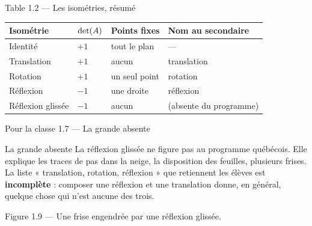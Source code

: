 \begin{frame}{Table 1.2 --- Les isométries, résumé}
  \begin{center}
  \begin{tabular}{llll}
    \toprule
    Isométrie & $\operatorname{det}(A)$ & Points fixes & Nom au secondaire\\
    \midrule
    Identité         & $+1$ & tout le plan  & --- \\
    Translation      & $+1$ & aucun         & translation \\
    Rotation         & $+1$ & un seul point & rotation \\
    Réflexion        & $-1$ & une droite    & réflexion \\
    Réflexion glissée & $-1$ & aucun         & (absente du programme) \\
    \bottomrule
  \end{tabular}
  \end{center}
\end{frame}

\begin{frame}{Pour la classe 1.7 --- La grande absente}
  \begin{Classe}{La grande absente}
    \small La réflexion glissée ne figure pas au programme québécois.
    Elle explique les traces de pas dans la neige, la disposition des
    feuilles, plusieurs frises. La liste « translation, rotation,
    réflexion » que retiennent les élèves est \textbf{incomplète} :
    composer une réflexion et une translation donne, en général,
    quelque chose qui n'est aucune des trois.
  \end{Classe}
  \begin{center}\small Figure 1.9 --- Une frise engendrée par une
  réflexion glissée.\end{center}
\end{frame}

